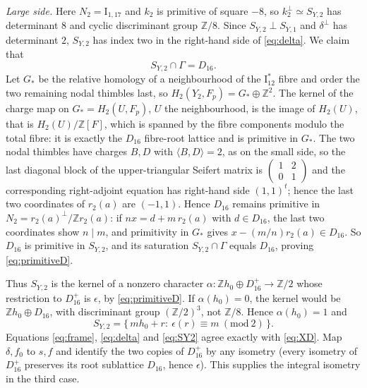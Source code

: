 \documentclass[11pt]{article}
\newcommand{\Z}{\mathbb Z}
\newcommand{\I}{\mathrm{I}}
\theoremstyle{definition}
\theoremstyle{remark}
\begin{document}
\emph{Large side.} Here \(N_2=\I_{1,17}\) and \(k_2\) is primitive of
square \(-8\), so \(k_2^\perp\simeq S_{Y,2}\) has determinant \(8\)
and cyclic discriminant group \(\Z/8\). Since
\(S_{Y,2}\perp S_{Y,1}\) and \(\delta^\perp\) has determinant \(2\),
\(S_{Y,2}\) has index two in the right-hand side of \eqref{eq:delta}.
We claim that
\begin{equation}\label{eq:primitiveD}
 S_{Y,2}\cap\Gamma=D_{16}.
\end{equation}
Let \(G_*\) be the relative homology of a neighbourhood of the
\(\I_{12}^*\) fibre and order the two remaining nodal thimbles last,
so \(H_2(Y_2,F_p)=G_*\oplus\Z^2\). The kernel of the charge map on
\(G_*=H_2(U,F_p)\), \(U\) the neighbourhood, is the image of
\(H_2(U)\), that is \(H_2(U)/\Z[F]\), which is spanned by the fibre
components modulo the total fibre: it is exactly the \(D_{16}\)
fibre-root lattice and is primitive in \(G_*\). The two nodal
thimbles have charges \(B,D\) with \(\langle B,D\rangle=2\), as on the
small side, so the last diagonal block of the upper-triangular Seifert
matrix is \(\left(\begin{smallmatrix}1&2\\0&1\end{smallmatrix}\right)\)
and the corresponding right-adjoint equation has right-hand side
\((1,1)^t\); hence the last two coordinates of \(r_2(a)\) are
\((-1,1)\). Hence \(D_{16}\) remains primitive in
\(N_2=r_2(a)^\perp/\Z r_2(a)\): if \(nx=d+m\,r_2(a)\) with
\(d\in D_{16}\), the last two coordinates show \(n\mid m\), and
primitivity in \(G_*\) gives \(x-(m/n)r_2(a)\in D_{16}\). So
\(D_{16}\) is primitive in \(S_{Y,2}\), and its saturation
\(S_{Y,2}\cap\Gamma\) equals \(D_{16}\), proving
\eqref{eq:primitiveD}.

Thus \(S_{Y,2}\) is the kernel of a nonzero character
\(\alpha\colon\Z h_0\oplus D_{16}^{+}\to\Z/2\) whose restriction to
\(D_{16}^+\) is \(\epsilon\), by \eqref{eq:primitiveD}. If
\(\alpha(h_0)=0\), the kernel would be \(\Z h_0\oplus D_{16}\), with
discriminant group \((\Z/2)^3\), not \(\Z/8\). Hence \(\alpha(h_0)=1\)
and
\begin{equation}\label{eq:SY2}
 S_{Y,2}=\{\,mh_0+r:\ \epsilon(r)\equiv m\ (\mathrm{mod}\ 2)\,\}.
\end{equation}
Equations \eqref{eq:frame}, \eqref{eq:delta} and \eqref{eq:SY2} agree
exactly with \eqref{eq:XD}. Map \(\delta,f_0\) to \(s,f\) and identify
the two copies of \(D_{16}^+\) by any isometry (every isometry of
\(D_{16}^+\) preserves its root sublattice \(D_{16}\), hence
\(\epsilon\)). This supplies the integral isometry in the third case.
\end{document}
